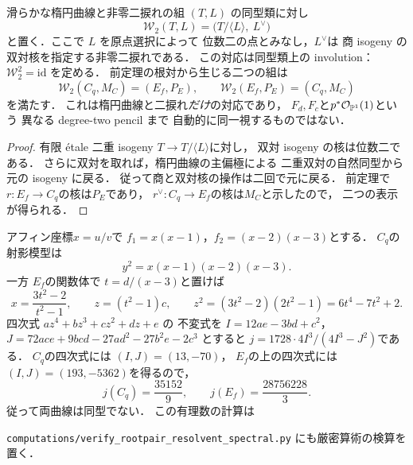 \begin{corollary}[非零二捩れ付き楕円曲線上の双対二重商]
\label{cor:qa-point-spectral-atkin-lehner}
滑らかな楕円曲線と非零二捩れの組
$(T,L)$ の同型類に対し
\[
 \mathcal W_2(T,L)=
 \bigl(T/\langle L\rangle,\ L^\vee\bigr)
 \tag{Dual-wall}\label{eq:qa-point-spectral-dual-wall}
\]
と置く．ここで $L$ を原点選択によって
位数二の点とみなし，$L^\vee$は
商 isogeny の双対核を指定する非零二捩れである．
この対応は同型類上の involution：
$\mathcal W_2^2=\mathrm{id}$ を定める．
前定理の根対から生じる二つの組は
\[
 \mathcal W_2(C_q,M_C)=(E_f,P_E),\qquad
 \mathcal W_2(E_f,P_E)=(C_q,M_C)
\]
を満たす．
これは楕円曲線と二捩れ\emph{だけ}の対応であり，
$F_d,F_c$と$p^*\mathcal O_{\mathbb P^1}(1)$という
異なる degree-two pencil まで
自動的に同一視するものではない．
\end{corollary}
\begin{proof}
有限 \'{e}tale 二重 isogeny
$T\to T/\langle L\rangle$に対し，
双対 isogeny の核は位数二である．
さらに双対を取れば，楕円曲線の主偏極による
二重双対の自然同型から元の isogeny に戻る．
従って商と双対核の操作は二回で元に戻る．
前定理で$r:E_f\to C_q$の核は$P_E$であり，
$r^\vee:C_q\to E_f$の核は$M_C$と示したので，
二つの表示が得られる．
\end{proof}

\begin{example}[二曲線は一般に同型でない]
\label{ex:qa-point-spectral-j-distinction}
アフィン座標$x=u/v$で
$f_1=x(x-1)$，$f_2=(x-2)(x-3)$とする．
$C_q$の射影模型は
\[
 y^2=x(x-1)(x-2)(x-3).
\]
一方 $E_f$の関数体で
$t=d/(x-3)$と置けば
\[
 x=\frac{3t^2-2}{t^2-1},\qquad
 z=(t^2-1)c,\qquad
 z^2=(3t^2-2)(2t^2-1)=6t^4-7t^2+2.
\]
四次式 $az^4+bz^3+cz^2+dz+e$ の
不変式を $I=12ae-3bd+c^2$，
$J=72ace+9bcd-27ad^2-27b^2e-2c^3$
とすると
$j=1728\cdot4I^3/(4I^3-J^2)$である．
$C_q$の四次式には $(I,J)=(13,-70)$，
$E_f$の上の四次式には $(I,J)=(193,-5362)$を得るので，
\[
 \boxed{j(C_q)=\frac{35152}{9},\qquad
        j(E_f)=\frac{28756228}{3}.}
 \tag{Distinct-j}\label{eq:qa-point-spectral-distinct-j}
\]
従って両曲線は同型でない．
この有理数の計算は

\noindent\texttt{computations/verify\_rootpair\_resolvent\_spectral.py}
にも厳密算術の検算を置く．
\end{example}

